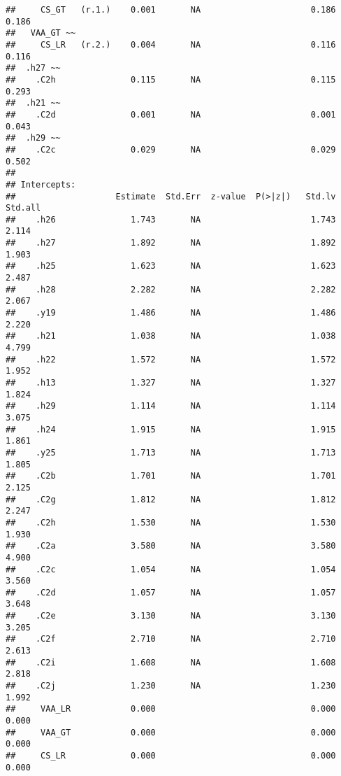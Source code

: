 \documentclass[
]{article}
\begin{document}
\begin{verbatim}
##     CS_GT   (r.1.)    0.001       NA                      0.186    0.186
##   VAA_GT ~~                                                             
##     CS_LR   (r.2.)    0.004       NA                      0.116    0.116
##  .h27 ~~                                                                
##    .C2h               0.115       NA                      0.115    0.293
##  .h21 ~~                                                                
##    .C2d               0.001       NA                      0.001    0.043
##  .h29 ~~                                                                
##    .C2c               0.029       NA                      0.029    0.502
## 
## Intercepts:
##                    Estimate  Std.Err  z-value  P(>|z|)   Std.lv  Std.all
##    .h26               1.743       NA                      1.743    2.114
##    .h27               1.892       NA                      1.892    1.903
##    .h25               1.623       NA                      1.623    2.487
##    .h28               2.282       NA                      2.282    2.067
##    .y19               1.486       NA                      1.486    2.220
##    .h21               1.038       NA                      1.038    4.799
##    .h22               1.572       NA                      1.572    1.952
##    .h13               1.327       NA                      1.327    1.824
##    .h29               1.114       NA                      1.114    3.075
##    .h24               1.915       NA                      1.915    1.861
##    .y25               1.713       NA                      1.713    1.805
##    .C2b               1.701       NA                      1.701    2.125
##    .C2g               1.812       NA                      1.812    2.247
##    .C2h               1.530       NA                      1.530    1.930
##    .C2a               3.580       NA                      3.580    4.900
##    .C2c               1.054       NA                      1.054    3.560
##    .C2d               1.057       NA                      1.057    3.648
##    .C2e               3.130       NA                      3.130    3.205
##    .C2f               2.710       NA                      2.710    2.613
##    .C2i               1.608       NA                      1.608    2.818
##    .C2j               1.230       NA                      1.230    1.992
##     VAA_LR            0.000                               0.000    0.000
##     VAA_GT            0.000                               0.000    0.000
##     CS_LR             0.000                               0.000    0.000

\end{verbatim}
\end{document}
